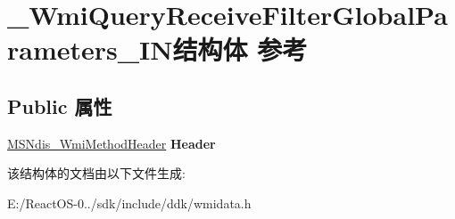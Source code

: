 \hypertarget{struct___wmi_query_receive_filter_global_parameters___i_n}{}\section{\+\_\+\+Wmi\+Query\+Receive\+Filter\+Global\+Parameters\+\_\+\+I\+N结构体 参考}
\label{struct___wmi_query_receive_filter_global_parameters___i_n}
\subsection*{Public 属性}
\begin{DoxyCompactItemize}
\item 
\mbox{\label{struct___wmi_query_receive_filter_global_parameters___i_n_a8c6c802f15a596b28839f4fe78b51026}} 
\hyperlink{struct___m_s_ndis___wmi_method_header}{M\+S\+Ndis\+\_\+\+Wmi\+Method\+Header} {\bfseries Header}
\end{DoxyCompactItemize}


该结构体的文档由以下文件生成\+:\begin{DoxyCompactItemize}
\item 
E\+:/\+React\+O\+S-\/0../sdk/include/ddk/wmidata.\+h\end{DoxyCompactItemize}
